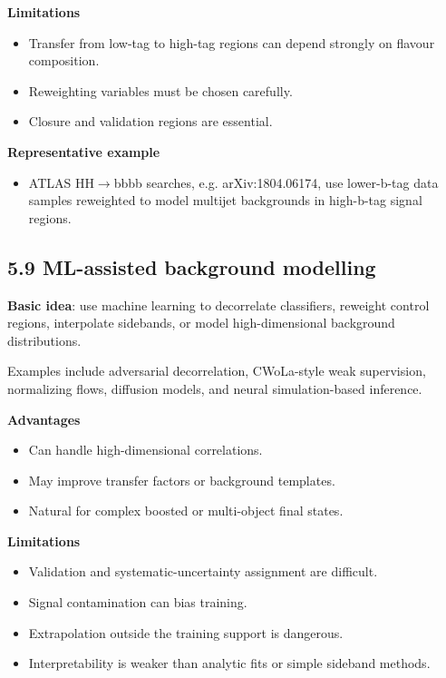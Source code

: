 \documentclass[11pt]{article}
\begin{document}
\textbf{Limitations}

\begin{itemize}
\item Transfer from low-tag to high-tag regions can depend strongly on flavour composition.
\item Reweighting variables must be chosen carefully.
\item Closure and validation regions are essential.
\end{itemize}

\textbf{Representative example}

\begin{itemize}
\item ATLAS HH$\to$bbbb searches, e.g. arXiv:1804.06174, use lower-b-tag data samples reweighted to model multijet backgrounds in high-b-tag signal regions.
\end{itemize}

\subsection{5.9 ML-assisted background modelling}

\textbf{Basic idea}: use machine learning to decorrelate classifiers, reweight control regions, interpolate sidebands, or model high-dimensional background distributions.

Examples include adversarial decorrelation, CWoLa-style weak supervision, normalizing flows, diffusion models, and neural simulation-based inference.

\textbf{Advantages}

\begin{itemize}
\item Can handle high-dimensional correlations.
\item May improve transfer factors or background templates.
\item Natural for complex boosted or multi-object final states.
\end{itemize}

\textbf{Limitations}

\begin{itemize}
\item Validation and systematic-uncertainty assignment are difficult.
\item Signal contamination can bias training.
\item Extrapolation outside the training support is dangerous.
\item Interpretability is weaker than analytic fits or simple sideband methods.
\end{itemize}
\end{document}
